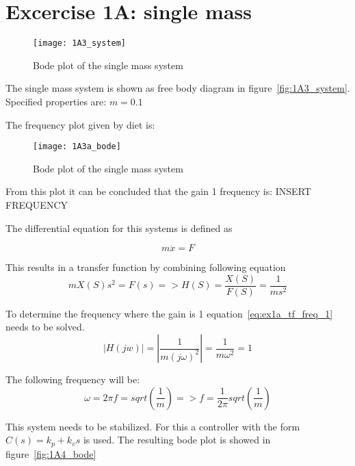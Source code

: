 \documentclass[report.tex]{subfiles}
\begin{document}
\chapter{Excercise 1A: single mass}


\begin{figure}[h!]
  \centering
\texttt{[image: 1A3\_system]}
\caption{Bode plot of the single mass system}
\end{figure}

The single mass system is shown as free body diagram in figure~\ref{fig:1A3_system}. Specified properties are: 
$ m = 0.1 $

The frequency plot given by diet is: \\

\begin{figure}[h!]
  \centering
\texttt{[image: 1A3a\_bode]}
\caption{Bode plot of the single mass system}
\end{figure}

From this plot it can be concluded that the gain 1 frequency is: INSERT FREQUENCY

The differential equation for this systems is defined as

\begin{equation}
\label{eq:ex1a_diff}
m\ddot{x} = F
\end{equation}

This results in a transfer function by combining following equation
\begin{equation}
\label{eq:ex1a_tf_mass_2}
mX(S)s^2 = F(s) => H(S) = \frac{X(S)}{F(S)} = \frac{1}{ms^2}
\end{equation}

To determine the frequency where the gain is 1 equation~\ref{eq:ex1a_tf_freq_1} needs to be solved. 
\begin{equation}
\label{eq:ex1a_tf_freq_1}
|H(jw)| = |\frac{1}{m(j\omega)^2}| = \frac{1}{m\omega^2} = 1
\end{equation}

The following frequency will be:
\begin{equation}
\label{eq:ex1a_tf_freq_2}
\omega = 2\pi f = sqrt(\frac{1}{m}) => f = \frac{1}{2\pi}sqrt(\frac{1}{m}) 
\end{equation}

This system needs to be stabilized. For this a controller with the form $C(s) = k_p + k_v s$ is used.
The resulting bode plot is showed in figure~\ref{fig:1A4_bode}
\end{document}
